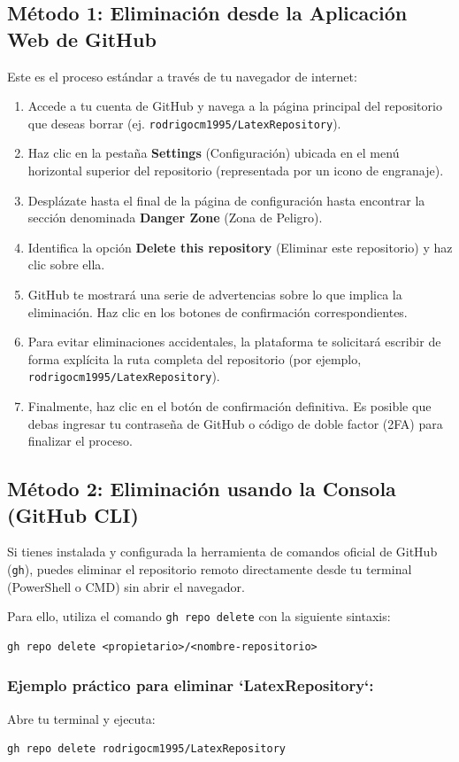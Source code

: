 \documentclass[
10pt, %
a4paper, %
oneside, %
headinclude,footinclude, %
BCOR5mm, %
]{scrartcl}
\begin{document}
\subsection{Método 1: Eliminación desde la Aplicación Web de GitHub}
Este es el proceso estándar a través de tu navegador de internet:
\begin{enumerate}
	\item Accede a tu cuenta de GitHub y navega a la página principal del repositorio que deseas borrar (ej. \texttt{rodrigocm1995/LatexRepository}).
	\item Haz clic en la pestaña \textbf{Settings} (Configuración) ubicada en el menú horizontal superior del repositorio (representada por un icono de engranaje).
	\item Desplázate hasta el final de la página de configuración hasta encontrar la sección denominada \textbf{Danger Zone} (Zona de Peligro).
	\item Identifica la opción \textbf{Delete this repository} (Eliminar este repositorio) y haz clic sobre ella.
	\item GitHub te mostrará una serie de advertencias sobre lo que implica la eliminación. Haz clic en los botones de confirmación correspondientes.
	\item Para evitar eliminaciones accidentales, la plataforma te solicitará escribir de forma explícita la ruta completa del repositorio (por ejemplo, \texttt{rodrigocm1995/LatexRepository}).
	\item Finalmente, haz clic en el botón de confirmación definitiva. Es posible que debas ingresar tu contraseña de GitHub o código de doble factor (2FA) para finalizar el proceso.
\end{enumerate}

\subsection{Método 2: Eliminación usando la Consola (GitHub CLI)}
Si tienes instalada y configurada la herramienta de comandos oficial de GitHub (\texttt{gh}), puedes eliminar el repositorio remoto directamente desde tu terminal (PowerShell o CMD) sin abrir el navegador.

Para ello, utiliza el comando \texttt{gh repo delete} con la siguiente sintaxis:
\begin{lstlisting}[language=DOS]
gh repo delete <propietario>/<nombre-repositorio>
\end{lstlisting}

\subsubsection{Ejemplo práctico para eliminar `LatexRepository`:}
Abre tu terminal y ejecuta:
\begin{lstlisting}[language=DOS]
gh repo delete rodrigocm1995/LatexRepository
\end{lstlisting}
\end{document}
